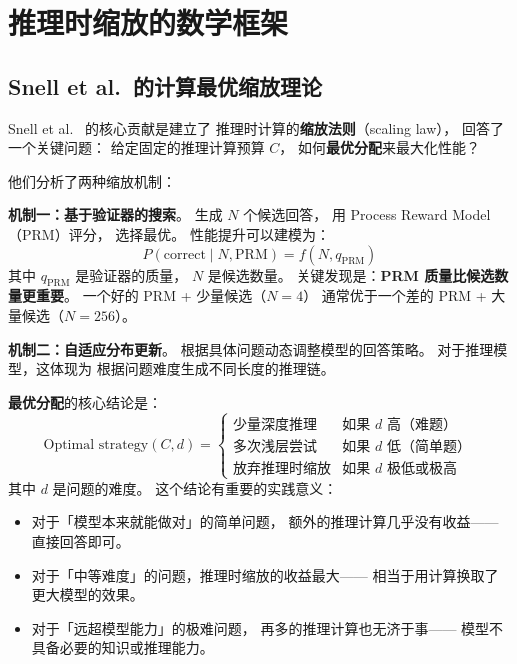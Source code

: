 \section{推理时缩放的数学框架}

\subsection{Snell et al.\ 的计算最优缩放理论}

Snell et al.~\cite{snell2024scaling} 的核心贡献是建立了
推理时计算的\textbf{缩放法则}（scaling law），
回答了一个关键问题：
给定固定的推理计算预算 $C$，
如何\textbf{最优分配}来最大化性能？

他们分析了两种缩放机制：

\textbf{机制一：基于验证器的搜索}。
生成 $N$ 个候选回答，
用 Process Reward Model（PRM）评分，
选择最优。
性能提升可以建模为：
\begin{equation}
  P(\text{correct} \mid N, \text{PRM}) = f(N, q_{\text{PRM}})
\end{equation}
其中 $q_{\text{PRM}}$ 是验证器的质量，
$N$ 是候选数量。
关键发现是：\textbf{PRM 质量比候选数量更重要}。
一个好的 PRM + 少量候选（$N = 4$）
通常优于一个差的 PRM + 大量候选（$N = 256$）。

\textbf{机制二：自适应分布更新}。
根据具体问题动态调整模型的回答策略。
对于推理模型，这体现为
根据问题难度生成不同长度的推理链。

\textbf{最优分配}的核心结论是：
\begin{equation}
  \text{Optimal strategy}(C, d) = \begin{cases}
    \text{少量深度推理} & \text{如果 } d \text{ 高（难题）} \\
    \text{多次浅层尝试} & \text{如果 } d \text{ 低（简单题）} \\
    \text{放弃推理时缩放} & \text{如果 } d \text{ 极低或极高}
  \end{cases}
\end{equation}
其中 $d$ 是问题的难度。
这个结论有重要的实践意义：
\begin{itemize}[noitemsep]
  \item 对于「模型本来就能做对」的简单问题，
        额外的推理计算几乎没有收益——直接回答即可。
  \item 对于「中等难度」的问题，推理时缩放的收益最大——
        相当于用计算换取了更大模型的效果。
  \item 对于「远超模型能力」的极难问题，
        再多的推理计算也无济于事——
        模型不具备必要的知识或推理能力。
\end{itemize}

